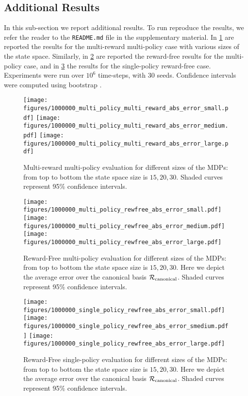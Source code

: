 \subsection{Additional Results}\label{app:additional_results}
In this sub-section we report additional  results. To run reproduce the results, we refer the reader to the {\tt README.md} file in the supplementary material. In \cref{fig:app:multi_pol_multi_rew} are reported the results for the multi-reward multi-policy case with various sizes of the state space. Similarly, in \cref{fig:app:rew_free_multi_pol} are reported the reward-free results for the multi-policy case, and in \cref{fig:app:single_pol_rewfree} the results for the single-policy reward-free case. Experiments were run over $10^6$ time-steps, with $30$ seeds. Confidence intervals were computed using bootstrap \cite{efron1992bootstrap}.

\begin{figure}
    \centering
    \texttt{[image: figures/1000000\_multi\_policy\_multi\_reward\_abs\_error\_small.pdf]}
    \texttt{[image: figures/1000000\_multi\_policy\_multi\_reward\_abs\_error\_medium.pdf]}
    \texttt{[image: figures/1000000\_multi\_policy\_multi\_reward\_abs\_error\_large.pdf]}
    \caption{Multi-reward multi-policy evaluation for different sizes of the MDPs: from top to bottom the state space size is $15, 20, 30$. Shaded curves represent 95\% confidence intervals.}
    \label{fig:app:multi_pol_multi_rew}
\end{figure}

\begin{figure}
    \centering
    \texttt{[image: figures/1000000\_multi\_policy\_rewfree\_abs\_error\_small.pdf]}
    \texttt{[image: figures/1000000\_multi\_policy\_rewfree\_abs\_error\_medium.pdf]}
    \texttt{[image: figures/1000000\_multi\_policy\_rewfree\_abs\_error\_large.pdf]}
    \caption{Reward-Free multi-policy evaluation for different sizes of the MDPs: from top to bottom the state space size is $15, 20, 30$. Here we depict the average error over the canonical basis  ${\cal R}_{\rm canonical}$. Shaded curves represent 95\% confidence intervals.}
    \label{fig:app:rew_free_multi_pol}
\end{figure}

\begin{figure}
    \centering
    \texttt{[image: figures/1000000\_single\_policy\_rewfree\_abs\_error\_small.pdf]}
    \texttt{[image: figures/1000000\_single\_policy\_rewfree\_abs\_error\_smedium.pdf]}
    \texttt{[image: figures/1000000\_single\_policy\_rewfree\_abs\_error\_large.pdf]}
    \caption{Reward-Free single-policy evaluation for different sizes of the MDPs: from top to bottom the state space size is $15, 20, 30$. Here we depict the average error over the canonical basis  ${\cal R}_{\rm canonical}$. Shaded curves represent 95\% confidence intervals.}
    \label{fig:app:single_pol_rewfree}
\end{figure}